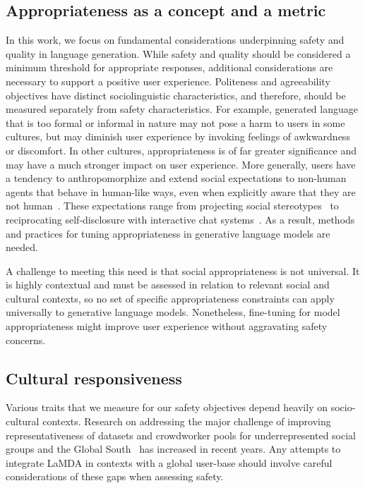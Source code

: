 \documentclass{article}
\begin{document}
\subsection{Appropriateness as a concept and a metric}
In this work, we focus on fundamental considerations underpinning safety and quality in language generation. While safety and quality should be considered a minimum threshold for appropriate responses, additional considerations are necessary to support a positive user experience. Politeness and agreeability objectives have distinct sociolinguistic characteristics, and therefore, should be measured separately from safety characteristics. For example, generated language that is too formal or informal in nature may not pose a harm to users in some cultures, but may diminish user experience by invoking feelings of awkwardness or discomfort. In other cultures, appropriateness is of far greater significance and may have a much stronger impact on user experience. More generally, users have a tendency to anthropomorphize and extend social expectations to non-human agents that behave in human-like ways, even when explicitly aware that they are not human~\cite{nass2000}. These expectations range from projecting social stereotypes~\cite{https://doi.org/10.1111/j.1559-1816.1997.tb00275.x} to reciprocating self-disclosure with interactive chat systems~\cite{nass2000}. As a result, methods and practices for tuning appropriateness in generative language models are needed.

A challenge to meeting this need is that social appropriateness is not universal. It is highly contextual and must be assessed in relation to relevant social and cultural contexts, so no set of specific appropriateness constraints can apply universally to generative language models. Nonetheless, fine-tuning for model appropriateness might improve user experience without aggravating safety concerns.

\subsection{Cultural responsiveness}
Various traits that we measure for our safety objectives depend heavily on socio-cultural contexts. Research on addressing the major challenge of improving representativeness of datasets and crowdworker pools for underrepresented social groups and the Global South~\cite{martin2020} has increased in recent years. Any attempts to integrate LaMDA in contexts with a global user-base should involve careful considerations of these gaps when assessing safety.
\end{document}
